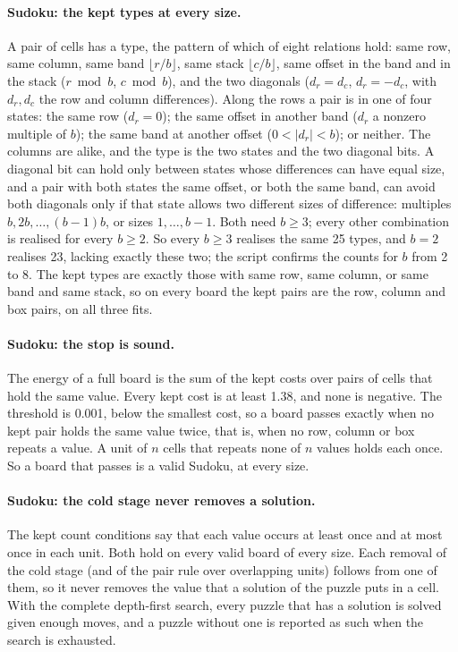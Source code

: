 \documentclass[10pt]{article}
\begin{document}
\paragraph{Sudoku: the kept types at every size.} A pair of cells has a type, the pattern of which of eight relations
hold: same row, same column, same band $\lfloor r/b\rfloor$, same stack $\lfloor c/b\rfloor$, same offset in the band and
in the stack ($r \bmod b$, $c \bmod b$), and the two diagonals ($d_r = d_c$, $d_r = -d_c$, with $d_r, d_c$ the row and
column differences). Along the rows a pair is in one of four states: the same row ($d_r=0$); the same offset in another
band ($d_r$ a nonzero multiple of $b$); the same band at another offset ($0<|d_r|<b$); or neither. The columns are
alike, and the type is the two states and the two diagonal bits. A diagonal bit can hold only between states whose
differences can have equal size, and a pair with both states the same offset, or both the same band, can avoid both
diagonals only if that state allows two different sizes of difference: multiples $b, 2b, \ldots, (b-1)b$, or sizes
$1,\ldots,b-1$. Both need $b \geq 3$; every other combination is realised for every $b \geq 2$. So every $b \geq 3$
realises the same 25 types, and $b=2$ realises 23, lacking exactly these two; the script confirms the
counts for $b$ from 2 to 8. The kept types are exactly those with same row, same column, or
same band and same stack, so on every board the kept pairs are the row, column and box pairs, on all three fits.

\paragraph{Sudoku: the stop is sound.} The energy of a full board is the sum of the kept costs over pairs of cells that
hold the same value. Every kept cost is at least 1.38, and none is negative. The threshold is
0.001, below the smallest cost, so a board passes exactly when no kept pair holds the same value twice, that is,
when no row, column or box repeats a value. A unit of $n$ cells that repeats none of $n$ values holds each once. So a
board that passes is a valid Sudoku, at every size.

\paragraph{Sudoku: the cold stage never removes a solution.} The kept count conditions say that each value occurs at
least once and at most once in each unit. Both hold on every valid board of every size. Each removal of the cold stage
(and of the pair rule over overlapping units) follows from one of them, so it never removes the value that a solution
of the puzzle puts in a cell. With the complete depth-first search, every puzzle that has a solution is solved given
enough moves, and a puzzle without one is reported as such when the search is exhausted.
\end{document}
